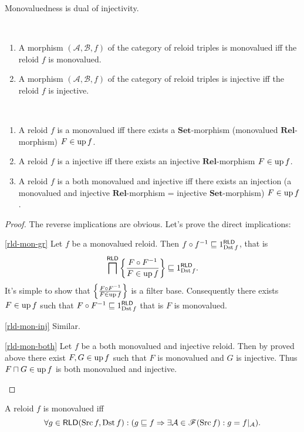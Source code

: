 Monovaluedness is dual of injectivity.
\begin{obvious}
~
\begin{enumerate}
\item A morphism $(\mathcal{A},\mathcal{B},f)$ of the category of reloid
triples is monovalued iff the reloid $f$ is monovalued.
\item A morphism $(\mathcal{A},\mathcal{B},f)$ of the category of reloid
triples is injective iff the reloid $f$ is injective.
\end{enumerate}
\end{obvious}
\begin{thm}
~
\begin{enumerate}
\item \label{rld-mon-gr}A reloid $f$ is a monovalued iff there exists
a $\mathbf{Set}$-morphism (monovalued $\mathbf{Rel}$-morphism) $F\in\operatorname{up} f$.
\item \label{rld-mon-inj}A reloid $f$ is a injective iff there exists
an injective $\mathbf{Rel}$-morphism $F\in\operatorname{up} f$.
\item \label{rld-mon-both}A reloid $f$ is a both monovalued and injective
iff there exists an injection (a monovalued and injective $\mathbf{Rel}$-morphism
= injective $\mathbf{Set}$-morphism) $F\in\operatorname{up} f$.
\end{enumerate}
\end{thm}
\begin{proof}
The reverse implications are obvious. Let's prove the direct implications:
\begin{widedisorder}
\item [{\ref{rld-mon-gr}}] Let $f$ be a monovalued reloid. Then $f\circ f^{-1}\sqsubseteq 1_{\operatorname{Dst} f}^{\mathsf{RLD}}$,
that is
\[\bigsqcap^{\mathsf{RLD}}\left\{ \frac{F\circ F^{-1}}{F\in\operatorname{up} f}\right\}\sqsubseteq 1_{\operatorname{Dst} f}^{\mathsf{RLD}}.\]
It's simple to show that $\left\{ \frac{F\circ F^{-1}}{F\in\operatorname{up} f}\right\}$ is
a filter base. Consequently there exists $F\in\operatorname{up} f$ such that $F\circ F^{-1}\sqsubseteq 1_{\operatorname{Dst} f}^{\mathsf{RLD}}$
that is $F$ is monovalued.
\item [{\ref{rld-mon-inj}}] Similar.
\item [{\ref{rld-mon-both}}] Let $f$ be a both monovalued and injective
reloid. Then by proved above there exist $F,G\in\operatorname{up} f$ such that
$F$ is monovalued and $G$ is injective. Thus $F\sqcap G\in\operatorname{up} f$
is both monovalued and injective.
\end{widedisorder}
\end{proof}
\begin{conjecture}
A reloid $f$ is monovalued iff
\[
\forall g\in\mathsf{\mathsf{RLD}}(\operatorname{Src} f,\operatorname{Dst} f):(g\sqsubseteq f\Rightarrow\exists\mathcal{A}\in\mathscr{F}(\operatorname{Src} f):g=f|_{\mathcal{A}}).
\]

\end{conjecture}

